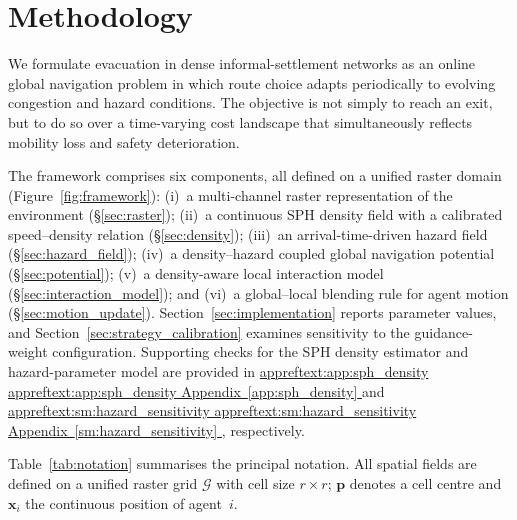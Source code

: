 \documentclass[preprint,12pt]{elsarticle}
\providecommand{\FloatBarrier}{}
\let\origsection\section
\renewcommand{\section}{\FloatBarrier\origsection}
\DeclareRobustCommand{\appref}[1]{%
  \hyperref[#1]{%
    \ifcsname appreftext:#1\endcsname%
      \csname appreftext:#1\endcsname%
    \else%
      Appendix~\ref*{#1}%
    \fi%
  }%
}
\begin{document}
\section{Methodology}
\label{sec:method}

We formulate evacuation in dense informal-settlement networks as an
online global navigation problem in which route choice adapts periodically
to evolving congestion and hazard conditions. The objective is not simply to reach
an exit, but to do so over a time-varying cost landscape that
simultaneously reflects mobility loss and safety deterioration.

The framework comprises six components, all defined on a unified raster
domain (Figure~\ref{fig:framework}):
(i)~a multi-channel raster representation of the environment
(\S\ref{sec:raster});
(ii)~a continuous SPH density field with a calibrated speed--density
relation (\S\ref{sec:density});
(iii)~an arrival-time-driven hazard field
(\S\ref{sec:hazard_field});
(iv)~a density--hazard coupled global navigation potential
(\S\ref{sec:potential});
(v)~a density-aware local interaction model
(\S\ref{sec:interaction_model});
and (vi)~a global--local blending rule for agent motion
(\S\ref{sec:motion_update}).
Section~\ref{sec:implementation} reports parameter values, and
Section~\ref{sec:strategy_calibration} examines sensitivity to the
guidance-weight configuration. Supporting checks for the SPH density
estimator and hazard-parameter model are provided in
\appref{app:sph_density} and \appref{sm:hazard_sensitivity}, respectively.

Table~\ref{tab:notation} summarises the principal notation. All spatial
fields are defined on a unified raster grid $\mathcal{G}$ with cell size
$r \times r$; $\mathbf{p}$ denotes a cell centre and $\mathbf{x}_i$ the
continuous position of agent~$i$.
\end{document}
